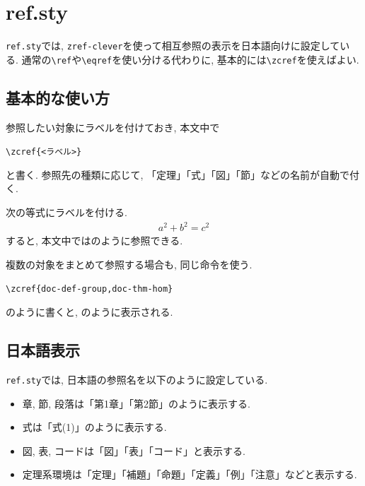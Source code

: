 \documentclass[../main.tex]{subfiles}
\begin{document}
\section{ref.sty}

\texttt{ref.sty}では, \texttt{zref-clever}を使って相互参照の表示を日本語向けに設定している. 
通常の\verb|\ref|や\verb|\eqref|を使い分ける代わりに, 基本的には\verb|\zcref|を使えばよい. 

\subsection{基本的な使い方}

参照したい対象にラベルを付けておき, 本文中で
\begin{center}
	\verb|\zcref{<ラベル>}|
\end{center}
と書く. 
参照先の種類に応じて, 「定理」「式」「図」「節」などの名前が自動で付く. 

\begin{ex}{}{}
	次の等式にラベルを付ける. 
	\begin{align}
		a^2+b^2=c^2 \label{doc-ref-pythagoras}
	\end{align}
	すると, 本文中ではのように参照できる. 
\end{ex}

複数の対象をまとめて参照する場合も, 同じ命令を使う. 
\begin{center}
	\verb|\zcref{doc-def-group,doc-thm-hom}|
\end{center}
のように書くと, のように表示される. 

\subsection{日本語表示}

\texttt{ref.sty}では, 日本語の参照名を以下のように設定している. 
\begin{itemize}
	\item 章, 節, 段落は「第1章」「第2節」のように表示する. 
	\item 式は「式(1)」のように表示する. 
	\item 図, 表, コードは「図」「表」「コード」と表示する. 
	\item 定理系環境は「定理」「補題」「命題」「定義」「例」「注意」などと表示する. 
\end{itemize}
\end{document}
